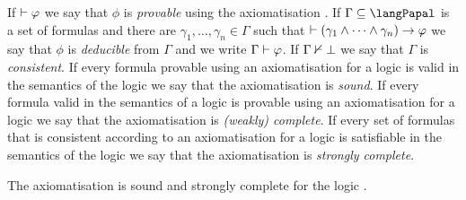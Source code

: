 If $\vdash \varphi$ we say that $\phi$ is {\em provable} using the axiomatisation \axiomPapalS{}.
If $\Gamma \subseteq \langPapal$ is a set of formulas and there are $\gamma_1, \dots, \gamma_n \in \Gamma$ such that $\vdash (\gamma_1 \land \cdots \land \gamma_n) \rightarrow \varphi$ we say that $\phi$ is {\em deducible} from $\Gamma$ and we write $\Gamma \vdash \varphi$.
If $\Gamma \nvdash \bot$ we say that $\Gamma$ is {\em consistent}.
If every formula provable using an axiomatisation for a logic is valid in the semantics of the logic we say that the axiomatisation is {\em sound}.
If every formula valid in the semantics of a logic is provable using an axiomatisation for a logic we say that the axiomatisation is {\em (weakly) complete}.
If every set of formulas that is consistent according to an axiomatisation for a logic is satisfiable in the semantics of the logic we say that the axiomatisation is {\em strongly complete}.

\begin{theorem}
    The axiomatisation \axiomPapalS{} is sound and strongly complete for the logic \logicPapalS{}.
\end{theorem}

